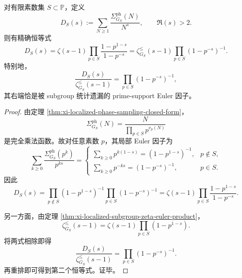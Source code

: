 \begin{proposition}\label{prop:conclusion-phase-sampling-dirichlet-subgroup-zeta-euler-splitting}
对有限素数集 \(S\subset\mathbb P\)，定义
\[
D_S(s):=\sum_{N\ge 1}\frac{\Sigma^{\mathrm{ph}}_{G_S}(N)}{N^s},
\qquad
\Re(s)>2.
\]
则有精确恒等式
\[
D_S(s)
=
\zeta(s-1)\prod_{p\in S}\frac{1-p^{1-s}}{1-p^{-s}}
=
\zeta_{G_S}^{\le}(s-1)\prod_{p\in S}(1-p^{-s})^{-1}.
\]
特别地，
\[
\frac{D_S(s)}{\zeta_{G_S}^{\le}(s-1)}
=
\prod_{p\in S}(1-p^{-s})^{-1},
\]
其右端恰是被 subgroup 统计遗漏的 prime-support Euler 因子。
\end{proposition}
\begin{proof}
由定理 \ref{thm:xi-localized-phase-sampling-closed-form}，
\[
\Sigma^{\mathrm{ph}}_{G_S}(N)
=
\frac{N}{\prod_{p\in S}p^{v_p(N)}}
\]
是完全乘法函数。故对任意素数 \(p\)，其局部 Euler 因子为
\[
\sum_{k\ge 0}\frac{\Sigma^{\mathrm{ph}}_{G_S}(p^k)}{p^{ks}}
=
\begin{cases}
\sum_{k\ge 0}p^{k(1-s)}=(1-p^{1-s})^{-1},& p\notin S,\\[1mm]
\sum_{k\ge 0}p^{-ks}=(1-p^{-s})^{-1},& p\in S.
\end{cases}
\]
因此
\[
D_S(s)
=
\prod_{p\notin S}(1-p^{1-s})^{-1}
\prod_{p\in S}(1-p^{-s})^{-1}
=
\zeta(s-1)\prod_{p\in S}\frac{1-p^{1-s}}{1-p^{-s}}.
\]

另一方面，由定理 \ref{thm:xi-localized-subgroup-zeta-euler-product}，
\[
\zeta_{G_S}^{\le}(s-1)
=
\zeta(s-1)\prod_{p\in S}(1-p^{1-s}).
\]
将两式相除即得
\[
\frac{D_S(s)}{\zeta_{G_S}^{\le}(s-1)}
=
\prod_{p\in S}(1-p^{-s})^{-1}.
\]
再重排即可得到第二个恒等式。证毕。
\end{proof}

